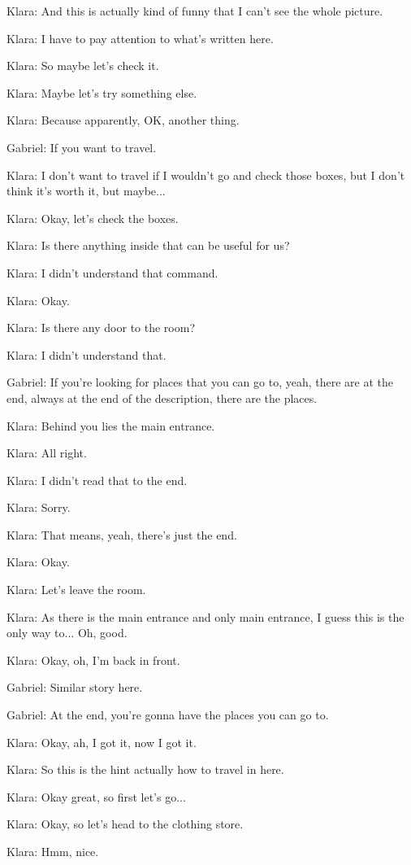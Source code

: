 Klara: And this is actually kind of funny that I can't see the whole picture.

Klara: I have to pay attention to what's written here.

Klara: So maybe let's check it.

Klara: Maybe let's try something else.

Klara: Because apparently, OK, another thing.

Gabriel: If you want to travel.

Klara: I don't want to travel if I wouldn't go and check those boxes, but I don't think it's worth it, but maybe...

Klara: Okay, let's check the boxes.

Klara: Is there anything inside that can be useful for us?

Klara: I didn't understand that command.

Klara: Okay.

Klara: Is there any door to the room?

Klara: I didn't understand that.

Gabriel: If you're looking for places that you can go to, yeah, there are at the end, always at the end of the description, there are the places.

Klara: Behind you lies the main entrance.

Klara: All right.

Klara: I didn't read that to the end.

Klara: Sorry.

Klara: That means, yeah, there's just the end.

Klara: Okay.

Klara: Let's leave the room.

Klara: As there is the main entrance and only main entrance, I guess this is the only way to... Oh, good.

Klara: Okay, oh, I'm back in front.

Gabriel: Similar story here.

Gabriel: At the end, you're gonna have the places you can go to.

Klara: Okay, ah, I got it, now I got it.

Klara: So this is the hint actually how to travel in here.

Klara: Okay great, so first let's go...

Klara: Okay, so let's head to the clothing store.

Klara: Hmm, nice.

